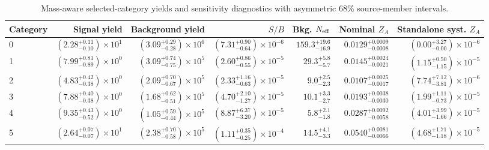 \begin{table}[tb]
  \centering
  \footnotesize
  \caption{Mass-aware selected-category yields and sensitivity diagnostics with asymmetric 68\% source-member intervals.}
  \label{tab:c7w-categories}
  \begin{tabular}{lrrrrrr}
    \toprule
    Category & Signal yield & Background yield & $S/B$ & Bkg. $N_{\rm eff}$ & Nominal $Z_A$ & Standalone syst. $Z_A$ \\
    \midrule
    0 & $(2.28^{+0.11}_{-0.10})\times10^{1}$ & $(3.09^{+0.29}_{-0.28})\times10^{6}$ & $(7.31^{+0.90}_{-0.64})\times10^{-6}$ & $159.3^{+19.6}_{-16.9}$ & $0.0129^{+0.0009}_{-0.0008}$ & $(0.00^{+3.27}_{-0.00})\times10^{-6}$ \\
    1 & $(7.99^{+0.81}_{-0.89})\times10^{0}$ & $(3.09^{+0.74}_{-0.75})\times10^{5}$ & $(2.60^{+0.86}_{-0.55})\times10^{-5}$ & $29.3^{+5.8}_{-5.7}$ & $0.0145^{+0.0024}_{-0.0021}$ & $(1.15^{+0.50}_{-1.15})\times10^{-5}$ \\
    2 & $(4.83^{+0.42}_{-0.38})\times10^{0}$ & $(2.09^{+0.70}_{-0.67})\times10^{5}$ & $(2.33^{+1.16}_{-0.63})\times10^{-5}$ & $9.0^{+2.5}_{-2.3}$ & $0.0107^{+0.0025}_{-0.0017}$ & $(7.74^{+7.12}_{-3.81})\times10^{-6}$ \\
    3 & $(7.88^{+0.40}_{-0.38})\times10^{0}$ & $(1.68^{+0.62}_{-0.51})\times10^{5}$ & $(4.70^{+2.10}_{-1.27})\times10^{-5}$ & $10.1^{+3.3}_{-2.7}$ & $0.0193^{+0.0038}_{-0.0030}$ & $(1.99^{+1.11}_{-0.73})\times10^{-5}$ \\
    4 & $(9.35^{+0.43}_{-0.52})\times10^{0}$ & $(1.05^{+0.59}_{-0.44})\times10^{5}$ & $(8.87^{+6.37}_{-3.20})\times10^{-5}$ & $5.8^{+2.1}_{-1.8}$ & $0.0287^{+0.0092}_{-0.0058}$ & $(4.01^{+3.99}_{-1.66})\times10^{-5}$ \\
    5 & $(2.64^{+0.07}_{-0.07})\times10^{1}$ & $(2.38^{+0.70}_{-0.58})\times10^{5}$ & $(1.11^{+0.35}_{-0.25})\times10^{-4}$ & $14.5^{+4.1}_{-3.3}$ & $0.0540^{+0.0081}_{-0.0066}$ & $(4.68^{+1.71}_{-1.18})\times10^{-5}$ \\
    \bottomrule
  \end{tabular}
\end{table}
